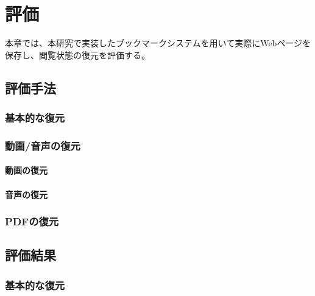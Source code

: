 \chapter{評価}
\label{chap:evaluation}
本章では、本研究で実装したブックマークシステムを用いて実際にWebページを保存し、閲覧状態の復元を評価する。

\section{評価手法}

\subsection{基本的な復元}


\subsection{動画/音声の復元}
\subsubsection{動画の復元}

\subsubsection{音声の復元}


\subsection{PDFの復元}

\section{評価結果}
\subsection{基本的な復元}

